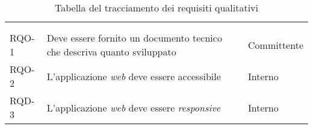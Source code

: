 \begin{center}
    {
      \renewcommand{\arraystretch}{1}
      \begin{longtable}{
        |>{\centering\arraybackslash}p{60pt}
        |>{\centering\arraybackslash}p{220pt}
        |>{\centering\arraybackslash}p{60pt}|}
  
        \rowcolor{antimaincolor!0}
        \caption{\label{tab:requisiti-qualitativi}Tabella del tracciamento dei requisiti qualitativi}                                             \\
  
        \hline
        \rowcolor{maincolor}
        \color{antimaincolor}{Requisito}                                                                 &
        \color{antimaincolor}{Descrizione}                                                               &
        \color{antimaincolor}{Fonte}                                                                               \\
        \hline
        \endhead
  
        \rowcolor{maincolor}
        \color{antimaincolor}{Requisito}                                                                 &
        \color{antimaincolor}{Descrizione}                                                               &
        \color{antimaincolor}{Fonte}                                                                               \\
        \hline
        \endfoot
        RQO-1     & Deve essere fornito un documento tecnico che
        descriva quanto sviluppato & Committente \\
        \hline

        RQO-2     & L'applicazione \textit{web} deve essere accessibile & Interno \\
        \hline

        
        RQD-3     & L'applicazione \textit{web} deve essere \textit{responsive} & Interno \\
        \hline
                
      \end{longtable}
      \renewcommand{\arraystretch}{1}
    }
  
  \end{center}